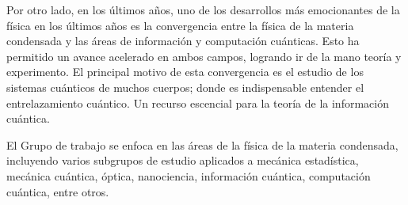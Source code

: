 \vspace{4mm}
\newline

Por otro lado, en los últimos años, uno de los desarrollos más emocionantes de la física en los últimos años es la convergencia entre la física de la materia condensada y las áreas de información y computación cuánticas. Esto ha permitido un avance acelerado en ambos campos, logrando ir de la mano teoría y experimento.  El principal motivo de esta convergencia es el estudio de los sistemas cuánticos de muchos cuerpos; donde es indispensable entender el entrelazamiento cuántico. Un recurso escencial para la teoría de la información cuántica.

\vspace{4mm}
\newline

El Grupo de trabajo se enfoca en las áreas de la física de la materia condensada, incluyendo varios subgrupos de estudio aplicados a mecánica estadística, mecánica cuántica, óptica, nanociencia, información cuántica, computación cuántica, entre otros.